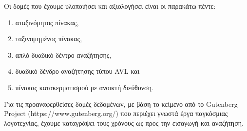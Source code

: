 Οι δομές που έχουμε υλοποιήσει και αξιολογήσει είναι οι παρακάτω πέντε:
\begin{enumerate}
    \item αταξινόμητος πίνακας,
    \item ταξινομημένος πίνακας,
    \item απλό δυαδικό δέντρο αναζήτησης,
    \item δυαδικό δένδρο αναζήτησης τύπου AVL και
    \item πίνακας κατακερματισμού με ανοικτή διεύθυνση.
\end{enumerate}

Για τις προαναφερθείσες δομές δεδομένων, με βάση το κείμενο από το Gutenberg Project (https://www.gutenberg.org/) που περιέχει γνωστά έργα παγκόσμιας λογοτεχνίας, έχουμε καταγράψει τους χρόνους ως προς την εισαγωγή και αναζήτηση.

\gr